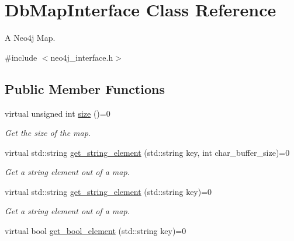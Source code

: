 \hypertarget{classDbMapInterface}{\section{Db\-Map\-Interface Class Reference}
\label{classDbMapInterface}
}


A Neo4j Map.  




{\ttfamily \#include $<$neo4j\-\_\-interface.\-h$>$}

\subsection*{Public Member Functions}
\begin{DoxyCompactItemize}
\item 
\hypertarget{classDbMapInterface_a56d046e72d1856177adc71a0aaa09952}{virtual unsigned int \hyperlink{classDbMapInterface_a56d046e72d1856177adc71a0aaa09952}{size} ()=0}\label{classDbMapInterface_a56d046e72d1856177adc71a0aaa09952}

\begin{DoxyCompactList}\small\item\em Get the size of the map. \end{DoxyCompactList}\item 
\hypertarget{classDbMapInterface_ae65d2f6aaad50dc9728ba8aeb6cc557f}{virtual std\-::string \hyperlink{classDbMapInterface_ae65d2f6aaad50dc9728ba8aeb6cc557f}{get\-\_\-string\-\_\-element} (std\-::string key, int char\-\_\-buffer\-\_\-size)=0}\label{classDbMapInterface_ae65d2f6aaad50dc9728ba8aeb6cc557f}

\begin{DoxyCompactList}\small\item\em Get a string element out of a map. \end{DoxyCompactList}\item 
\hypertarget{classDbMapInterface_a26cfc56d753345b64fa9ab08b10dac34}{virtual std\-::string \hyperlink{classDbMapInterface_a26cfc56d753345b64fa9ab08b10dac34}{get\-\_\-string\-\_\-element} (std\-::string key)=0}\label{classDbMapInterface_a26cfc56d753345b64fa9ab08b10dac34}

\begin{DoxyCompactList}\small\item\em Get a string element out of a map. \end{DoxyCompactList}\item 
\hypertarget{classDbMapInterface_a402f75085fa2dacc8808d4b3650bd652}{virtual bool \hyperlink{classDbMapInterface_a402f75085fa2dacc8808d4b3650bd652}{get\-\_\-bool\-\_\-element} (std\-::string key)=0}\label{classDbMapInterface_a402f75085fa2dacc8808d4b3650bd652}


\end{DoxyCompactItemize}
